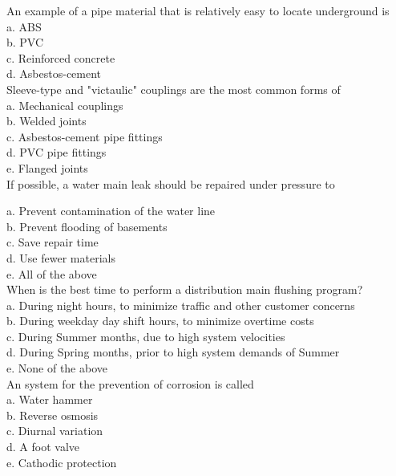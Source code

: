   An example of a pipe material that is relatively easy to locate underground is\\
a. ABS\\
b. PVC\\
c. Reinforced concrete \\
d. Asbestos-cement\\

Sleeve-type and "victaulic" couplings are the most common forms of\\

a. Mechanical couplings\\

b. Welded joints\\

c. Asbestos-cement pipe fittings\\

d. PVC pipe fittings\\

e. Flanged joints\\

If possible, a water main leak should be repaired under pressure to

a. Prevent contamination of the water line\\

b. Prevent flooding of basements\\

c. Save repair time\\

d. Use fewer materials\\

e. All of the above\\

When is the best time to perform a distribution main flushing program?\\
a. During night hours, to minimize traffic and other customer concerns\\
b. During weekday day shift hours, to minimize overtime costs\\
c. During Summer months, due to high system velocities\\
d. During Spring months, prior to high system demands of Summer\\
e. None of the above\\

An system for the prevention of corrosion is called\\
a. Water hammer\\
b. Reverse osmosis\\
c. Diurnal variation\\
d. A foot valve\\
e. Cathodic protection\\

